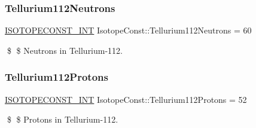 \subsubsection{\texorpdfstring{Tellurium112\+Neutrons}{Tellurium112Neutrons}}
{\footnotesize\ttfamily \mbox{\hyperlink{group___isotope_const-_macros_ga5f18360b3e99483a35c32d789e62621c}{I\+S\+O\+T\+O\+P\+E\+C\+O\+N\+S\+T\+\_\+\+I\+NT}} Isotope\+Const\+::\+Tellurium112\+Neutrons = 60}

\$ \$ Neutrons in Tellurium-\/112. \mbox{\label{group___isotope_const-_tellurium-_te112_gaa00f1aec145a2af7fcc86823f9684c39}} 
\subsubsection{\texorpdfstring{Tellurium112\+Protons}{Tellurium112Protons}}
{\footnotesize\ttfamily \mbox{\hyperlink{group___isotope_const-_macros_ga5f18360b3e99483a35c32d789e62621c}{I\+S\+O\+T\+O\+P\+E\+C\+O\+N\+S\+T\+\_\+\+I\+NT}} Isotope\+Const\+::\+Tellurium112\+Protons = 52}

\$ \$ Protons in Tellurium-\/112. 